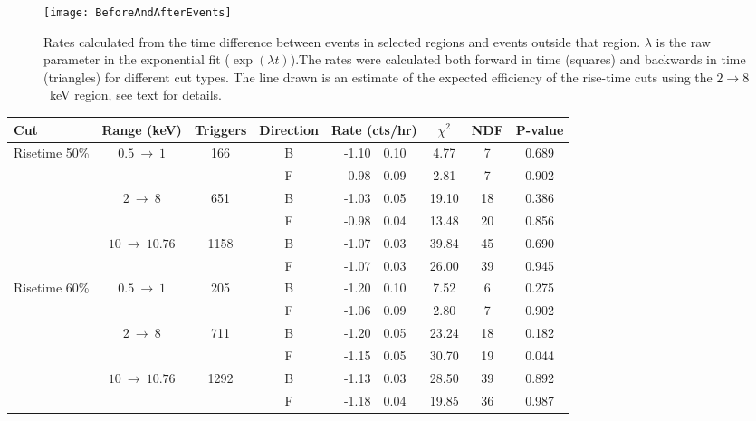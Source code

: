 			\begin{figure}
				\centering
				\texttt{[image: BeforeAndAfterEvents]}
				\caption[Rates calculated from the time difference between events in selected regions]
				{Rates calculated from the time difference between events in selected regions and events outside that region.  $\lambda$ is the raw parameter in the exponential fit ($\exp(\lambda t)$).The rates were calculated both forward
				in time (squares) and backwards in time (triangles) for different cut types.  The line drawn is an estimate of the 
				expected efficiency of the rise-time cuts using the $2\to8$~keV region, see text for details.}
				\label{fig:BeGeForBack}
			\end{figure}	
			
			\begin{table} \scriptsize
				\centering
				\renewcommand{\arraystretch}{0.68}
				\begin{tabular}{l  c  c  c  r@{$~\pm~$}l  c  c  c } 
				\toprule
					Cut & Range (keV) & Triggers & Direction & \multicolumn{2}{c}{Rate (cts/hr)} & $\chi^2$ & NDF & P-value  \\
				\midrule
				\multirow{6}{*}{Risetime 50\%}& \multirow{2}{*}{$0.5~\to~1$} & \multirow{2}{*}{166}	& B & -1.10 & 0.10 & 4.77 & 7 & 0.689\\
					& & & F & -0.98 & 0.09 & 2.81 & 7 & 0.902\\
				& \multirow{2}{*}{$2~\to~8$} & \multirow{2}{*}{651}	& B & -1.03 & 0.05 & 19.10 & 18 & 0.386\\
					& & & F & -0.98 & 0.04 & 13.48 & 20 & 0.856\\
				& \multirow{2}{*}{$10~\to~10.76$} & \multirow{2}{*}{1158}	& B & -1.07 & 0.03 & 39.84 & 45 & 0.690\\
					& & & F & -1.07 & 0.03 & 26.00 & 39 & 0.945\\
				\midrule
				
				\multirow{6}{*}{Risetime 60\%}& \multirow{2}{*}{$0.5~\to~1$} & \multirow{2}{*}{205}	& B & -1.20 & 0.10 & 7.52 & 6 & 0.275\\
					& & & F & -1.06 & 0.09 & 2.80 & 7 & 0.902\\
				& \multirow{2}{*}{$2~\to~8$} & \multirow{2}{*}{711}	& B & -1.20 & 0.05 & 23.24 & 18 & 0.182\\
					& & & F & -1.15 & 0.05 & 30.70 & 19 & 0.044\\
				& \multirow{2}{*}{$10~\to~10.76$} & \multirow{2}{*}{1292}	& B & -1.13 & 0.03 & 28.50 & 39 & 0.892\\
					& & & F & -1.18 & 0.04 & 19.85 & 36 & 0.987\\
				\midrule
				

\end{tabular}
\end{table}
